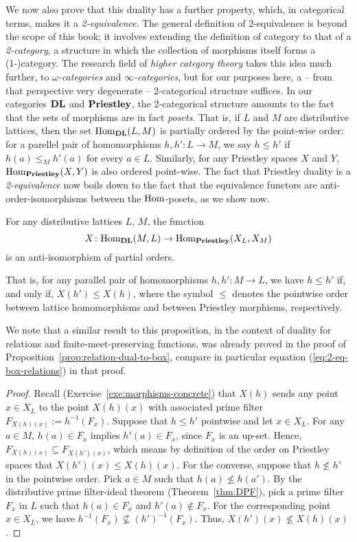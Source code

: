 We now also prove that this duality has a further property, which, in categorical terms, makes it a \emph{2-equivalence}. The general definition of 2-equivalence is beyond the scope of this book; it involves extending the definition of category to that of a \emph{2-category}, a structure in which the collection of morphisms itself forms a (1-)category. The research field of \emph{higher category theory} takes this idea much further, to \emph{$\omega$-categories} and \emph{$\infty$-categories}, but for our purposes here, a -- from that perspective very degenerate -- 2-categorical structure suffices. In our categories $\mathbf{DL}$ and $\mathbf{Priestley}$, the 2-categorical structure amounts to the fact that the sets of morphisms are in fact \emph{posets}. That is, if $L$ and $M$ are distributive lattices, then the set $\mathrm{Hom}_{\mathbf{DL}}(L,M)$ is partially ordered by the point-wise order: for a parellel pair of homomorphisms $h, h' \colon L \to M$, we say $h \leq h'$ if $h(a) \leq_M h'(a)$ for every $a \in L$. Similarly, for any Priestley spaces $X$ and $Y$, $\mathrm{Hom}_{\mathbf{Priestley}}(X,Y)$ is also ordered point-wise. The fact that Priestley duality is a \emph{2-equivalence} now boils down to the fact that the equivalence functors are anti-order-isomorphisms between the $\mathrm{Hom}$-posets, as we show now. 
\begin{proposition}\label{prop:priestley-2-eq}
  For any distributive lattices $L$, $M$, the function $$X \colon \mathrm{Hom}_{\mathbf{DL}}(M, L) \to \mathrm{Hom}_{\mathbf{Priestley}}(X_L,X_M)$$ is an anti-isomorphism of partial orders.

  That is, for any parallel pair of homomorphisms $h, h' \colon M \to L$, we have $h \leq h'$ if, and only if, $X(h') \leq X(h)$, where the symbol $\leq$ denotes the pointwise order between lattice homomorphisms and between Priestley morphisms, respectively. 
\end{proposition}
We note that a similar result to this proposition, in the context of duality for relations and finite-meet-preserving functions, was already proved in the proof of Proposition~\ref{prop:relation-dual-to-box}, compare in particular equation (\ref{eq:2-eq-box-relations}) in that proof.
\begin{proof}
Recall (Exercise~\ref{exe:morphisms-concrete}) that $X(h)$ sends any point $x \in X_L$ to the point $X(h)(x)$ with associated prime filter $F_{X(h)(x)} := h^{-1}(F_x)$. Suppose that $h \leq h'$ pointwise and let $x \in X_L$. For any $a \in M$, $h(a) \in F_x$ implies $h'(a) \in F_x$, since $F_x$ is an up-set. Hence, $F_{X(h)(x)} \subseteq F_{X(h')(x)}$, which means by definition of the order on Priestley spaces that $X(h')(x) \leq X(h)(x)$. For the converse, suppose that $h \nleq h'$ in the pointwise order. Pick $a \in M$ such that $h(a) \nleq h(a')$. By the distributive prime filter-ideal theorem (Theorem~\ref{thm:DPF}), pick a prime filter $F_x$ in $L$ such that $h(a) \in F_x$ and $h'(a) \not\in F_x$. For the corresponding point $x \in X_L$, we have $h^{-1}(F_x) \not\subseteq (h')^{-1}(F_x)$. Thus, $X(h')(x) \nleq X(h)(x)$.
\end{proof}

